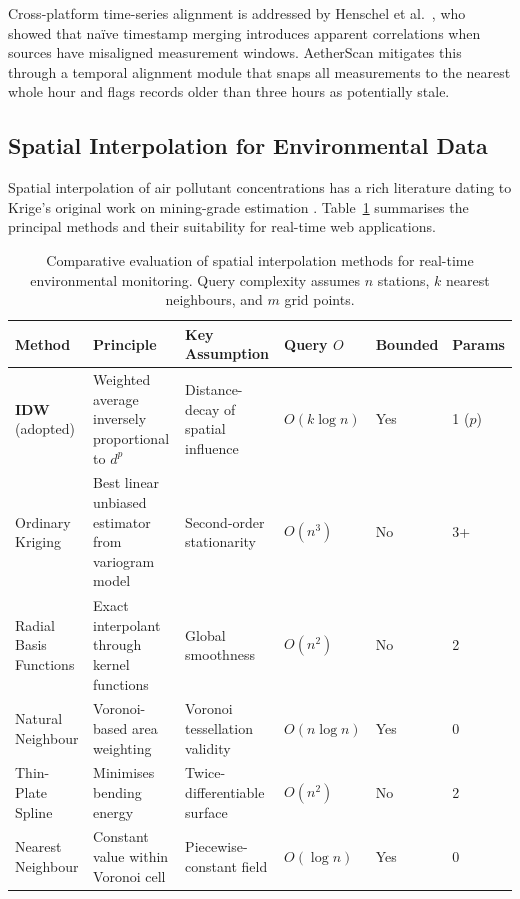 \documentclass[12pt,a4paper]{article}
\begin{document}
Cross-platform time-series alignment is addressed by Henschel et al.~\cite{henschel2018},
who showed that na\"ive timestamp merging introduces apparent correlations when
sources have misaligned measurement windows. AetherScan mitigates this through
a temporal alignment module that snaps all measurements to the nearest whole hour
and flags records older than three hours as potentially stale.

\subsection{Spatial Interpolation for Environmental Data}
\label{sec:litreview:interp}

Spatial interpolation of air pollutant concentrations has a rich literature
dating to Krige's original work on mining-grade estimation \cite{krige1951}.
Table~\ref{tab:interp_compare} summarises the principal methods and their
suitability for real-time web applications.

\begin{table}[H]
\centering
\caption[Comparative evaluation of spatial interpolation methods]{%
Comparative evaluation of spatial interpolation methods for real-time
environmental monitoring. Query complexity assumes $n$ stations,
$k$ nearest neighbours, and $m$ grid points.}
\label{tab:interp_compare}
\begin{tabularx}{\textwidth}{@{}lXXlll@{}}
\toprule
\textbf{Method} & \textbf{Principle} & \textbf{Key Assumption} &
\textbf{Query $O$} & \textbf{Bounded} & \textbf{Params} \\
\midrule
\textbf{IDW} (adopted) &
  Weighted average inversely proportional to $d^p$ &
  Distance-decay of spatial influence &
  $O(k\log n)$ & Yes & 1 ($p$) \\[4pt]
Ordinary Kriging &
  Best linear unbiased estimator from variogram model &
  Second-order stationarity &
  $O(n^3)$ & No & 3+ \\[4pt]
Radial Basis Functions &
  Exact interpolant through kernel functions &
  Global smoothness &
  $O(n^2)$ & No & 2 \\[4pt]
Natural Neighbour &
  Voronoi-based area weighting &
  Voronoi tessellation validity &
  $O(n\log n)$ & Yes & 0 \\[4pt]
Thin-Plate Spline &
  Minimises bending energy &
  Twice-differentiable surface &
  $O(n^2)$ & No & 2 \\[4pt]
Nearest Neighbour &
  Constant value within Voronoi cell &
  Piecewise-constant field &
  $O(\log n)$ & Yes & 0 \\
\bottomrule
\end{tabularx}
\end{table}
\end{document}
